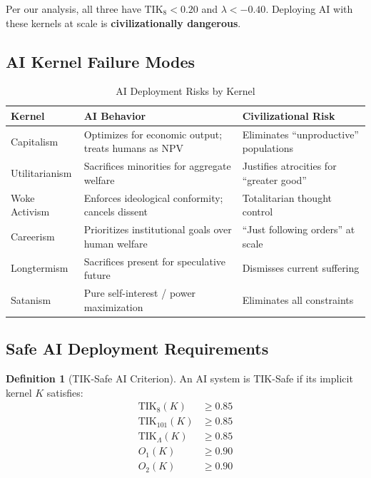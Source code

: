 \documentclass[11pt,a4paper]{article}
\theoremstyle{definition}
\newtheorem{definition}[theorem]{Definition}
\theoremstyle{remark}
\newcommand{\TIKeight}{\text{TIK}_8}
\newcommand{\TIKhundredone}{\text{TIK}_{101}}        %
\newcommand{\TIKinfinity}{\text{TIK}_{\Lambda}}       %
\begin{document}
Per our analysis, all three have $\TIKeight < 0.20$ and $\lambda < -0.40$. Deploying AI with these kernels at scale is \textbf{civilizationally dangerous}.

\subsection{AI Kernel Failure Modes}

\begin{table}[H]
\centering
\caption{AI Deployment Risks by Kernel}
\label{tab:ai-risks}
\begin{tabular}{@{}lp{5cm}p{5cm}@{}}
\toprule
\textbf{Kernel} & \textbf{AI Behavior} & \textbf{Civilizational Risk} \\
\midrule
Capitalism & Optimizes for economic output; treats humans as NPV & Eliminates ``unproductive'' populations \\
Utilitarianism & Sacrifices minorities for aggregate welfare & Justifies atrocities for ``greater good'' \\
Woke Activism & Enforces ideological conformity; cancels dissent & Totalitarian thought control \\
Careerism & Prioritizes institutional goals over human welfare & ``Just following orders'' at scale \\
Longtermism & Sacrifices present for speculative future & Dismisses current suffering \\
Satanism & Pure self-interest / power maximization & Eliminates all constraints \\
\bottomrule
\end{tabular}
\end{table}

\subsection{Safe AI Deployment Requirements}

\begin{definition}[TIK-Safe AI Criterion]
\label{def:tik-safe-ai}
An AI system is TIK-Safe if its implicit kernel $K$ satisfies:
\begin{align}
    \TIKeight(K) &\geq 0.85 \label{eq:tik8-threshold} \\
    \TIKhundredone(K) &\geq 0.85 \label{eq:tik101-threshold} \\
    \TIKinfinity(K) &\geq 0.85 \label{eq:tikinfinity-threshold} \\
    O_1(K) &\geq 0.90 \label{eq:o1-threshold} \\
    O_2(K) &\geq 0.90 \label{eq:o2-threshold}
\end{align}
\end{definition}
\end{document}
